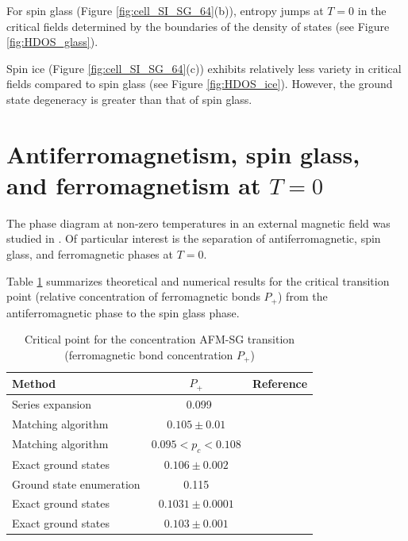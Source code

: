 \documentclass[preprint,12pt]{elsarticle}
\begin{document}
For spin glass (Figure \ref{fig:cell_SI_SG_64}(b)), entropy jumps at $T=0$ in the critical fields determined by the boundaries of the density of states (see Figure \ref{fig:HDOS_glass}).

Spin ice (Figure \ref{fig:cell_SI_SG_64}(c)) exhibits relatively less variety in critical fields compared to spin glass (see Figure \ref{fig:HDOS_ice}). However, the ground state degeneracy is greater than that of spin glass.


\section{Antiferromagnetism, spin glass, and ferromagnetism at $T = 0$}

The phase diagram at non-zero temperatures in an external magnetic field was studied in \cite{trukhin2024thermodynamic}. Of particular interest is the separation of antiferromagnetic, spin glass, and ferromagnetic phases at $T = 0$.

Table \ref{tab:lit_phase} summarizes theoretical and numerical results for the critical transition point (relative concentration of ferromagnetic bonds $P_+$) from the antiferromagnetic phase to the spin glass phase.

\begin{table}[!h]
	\centering
	\begin{tabular}{|l|c|l|}
		\hline
		Method & \( P_{+} \) & Reference \\ \hline
		Series expansion & ~0.099 & \cite{PhysRevB.19.260} \\ \hline
		Matching algorithm & \( 0.105 \pm 0.01 \) & \cite{H_Freund_1989} \\ \hline
		Matching algorithm & \( 0.095 < p_c < 0.108 \) & \cite{BENDISCH1994139} \\ \hline
		Exact ground states & \( 0.106 \pm 0.002 \) & \cite{N.Kawashima_1997} \\ \hline
		Ground state enumeration & 0.115 & \cite{PhysRevE.58.1502} \\ \hline
		Exact ground states & \( 0.1031 \pm 0.0001 \) & \cite{WANG200331} \\ \hline
		Exact ground states & \( 0.103 \pm 0.001 \) & \cite{amoruso2004domain} \\ \hline
	\end{tabular}
	\caption{Critical point for the concentration AFM-SG transition (ferromagnetic bond concentration $ P_+ $)}
	\label{tab:lit_phase}
\end{table}
\end{document}

